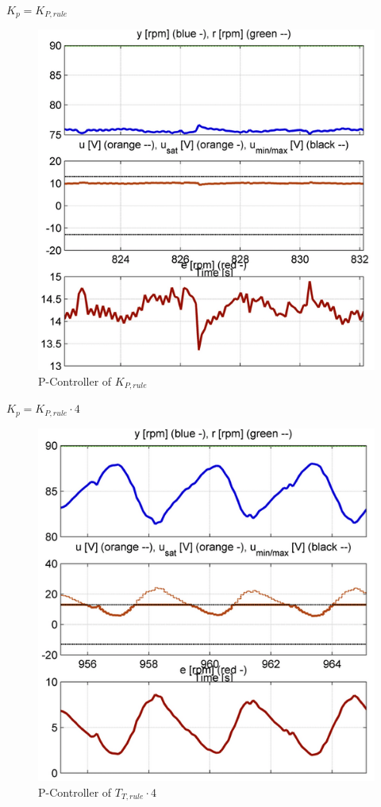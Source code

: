 \begin{center}
{$K_{p}= K_{P,rule}$}
\end{center}
\begin{figure}[H]
\begin{center}
\includegraphics[width=0.6\linewidth]{images/general//P/p_controller1}
\end{center}
\caption{P-Controller of $ K_{P,rule}$}
\label{fig:p_controller1}
\end{figure}

\begin{center}
{$K_{p}= K_{P,rule}\cdot4$}
\end{center}
\begin{figure}[H]
\begin{center}
\includegraphics[width=0.6\linewidth]{images/general//P/p_controller4}
\end{center}
\caption{P-Controller of $ T_{T,rule}\cdot{4}$}
\label{fig:p_controller4}
\end{figure}
\clearpage

